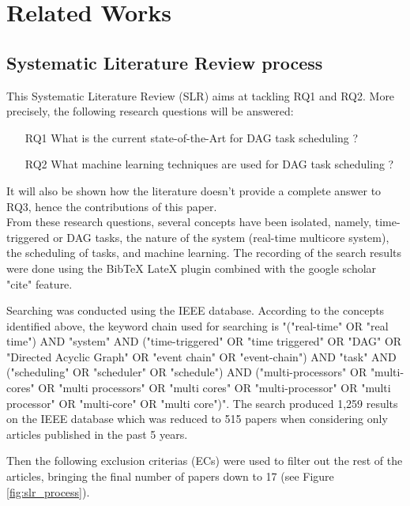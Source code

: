 
\section{Related Works}
\label{sec:literature}

\subsection{Systematic Literature Review process}

This Systematic Literature Review (SLR) aims at tackling RQ1 and RQ2. More precisely, the following research questions will be answered:

\begin{itemize}
    \item [RQ1] What is the current state-of-the-Art for DAG task scheduling ?        
    \item [RQ2] What machine learning  techniques are used for DAG task scheduling ?
\end{itemize}
It will also be shown how the literature doesn't provide 
a complete answer to RQ3, hence the contributions of this paper.\\

From these research questions, several concepts have been isolated,
namely, time-triggered or DAG tasks, the nature of the system (real-time multicore system),
the scheduling of tasks, and machine learning.
The recording of the search results were done using the BibTeX LateX plugin
combined with the google scholar "cite" feature.

Searching was conducted using the IEEE database.
According to the concepts identified above, 
the keyword chain used for searching is
"("real-time" OR "real time") AND 
"system" AND ("time-triggered" OR "time triggered" OR "DAG" OR "Directed Acyclic Graph" OR "event chain" OR "event-chain") 
AND "task" 
AND ("scheduling" OR "scheduler" OR "schedule") 
AND ("multi-processors" OR "multi-cores" OR "multi processors" OR 
"multi cores" OR "multi-processor" OR "multi processor" OR 
"multi-core" OR "multi core")".
The search produced 1,259 results on the IEEE database
which was reduced to 515 papers when considering only 
articles published in the past 5 years.

Then the following exclusion criterias (ECs) were used to filter out 
the rest of the articles, bringing the final number of papers down to 17
(see Figure \ref{fig:slr_process}).

